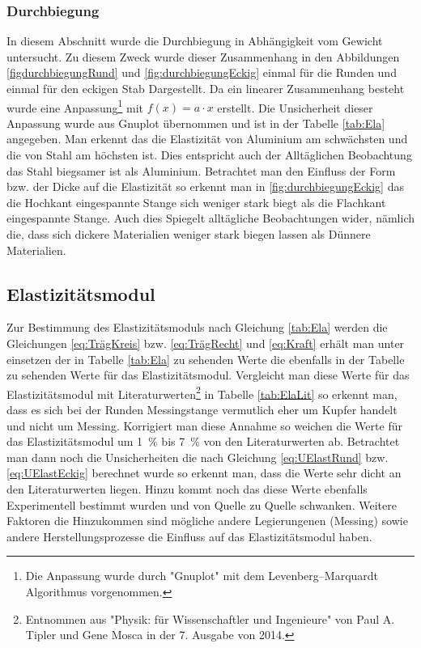 \subsubsection*{Durchbiegung}
In diesem Abschnitt wurde die Durchbiegung in Abhängigkeit vom Gewicht untersucht. Zu diesem Zweck wurde dieser Zusammenhang in den Abbildungen \ref{figdurchbiegungRund} und \ref{fig:durchbiegungEckig} einmal für die Runden und einmal für den eckigen Stab Dargestellt. Da ein linearer Zusammenhang besteht wurde eine Anpassung\footnote{Die Anpassung wurde durch "Gnuplot" mit dem Levenberg–Marquardt Algorithmus vorgenommen.  }  mit $f(x)=a \cdot x$ erstellt. Die Unsicherheit dieser Anpassung wurde aus Gnuplot übernommen und ist in der Tabelle \ref{tab:Ela} angegeben.
Man erkennt das die Elastizität von Aluminium am schwächsten und die von Stahl am höchsten ist. Dies entspricht auch der Alltäglichen Beobachtung das Stahl biegsamer ist als Aluminium.
Betrachtet man den Einfluss der Form bzw. der Dicke auf die Elastizität so erkennt man in \ref{fig:durchbiegungEckig} das die Hochkant eingespannte Stange sich weniger stark biegt als die Flachkant eingespannte Stange. Auch dies Spiegelt alltägliche Beobachtungen wider, nämlich die, dass sich dickere Materialien weniger stark biegen lassen als Dünnere Materialien.

\subsection{Elastizitätsmodul}

Zur Bestimmung des Elastizitätsmoduls nach Gleichung \ref{tab:Ela} werden die Gleichungen \ref{eq:TrägKreis} bzw. \ref{eq:TrägRecht} und \ref{eq:Kraft} erhält man unter einsetzen der in Tabelle \ref{tab:Ela} zu sehenden Werte die ebenfalls in der Tabelle zu sehenden Werte für das Elastizitätsmodul.
Vergleicht man diese Werte für das Elastizitätsmodul mit Literaturwerten\footnote{Entnommen aus "Physik: für Wissenschaftler und Ingenieure" von Paul A. Tipler und Gene Mosca in der 7. Ausgabe von 2014.} in Tabelle \ref{tab:ElaLit} so erkennt man, dass es sich bei der Runden Messingstange vermutlich eher um Kupfer handelt und nicht um Messing. Korrigiert man diese Annahme so weichen die Werte für das Elastizitätsmodul um \SI{1}{\percent} bis \SI{7}{\percent} von den Literaturwerten ab. Betrachtet man dann noch die Unsicherheiten die nach Gleichung \ref{eq:UElastRund} bzw. \ref{eq:UElastEckig} berechnet wurde so erkennt man, dass die Werte sehr dicht an den Literaturwerten liegen. Hinzu kommt noch das diese Werte ebenfalls Experimentell bestimmt wurden und von Quelle zu Quelle schwanken. Weitere Faktoren die Hinzukommen sind mögliche andere Legierungenen (Messing) sowie andere Herstellungsprozesse die Einfluss auf das Elastizitätsmodul haben. 

